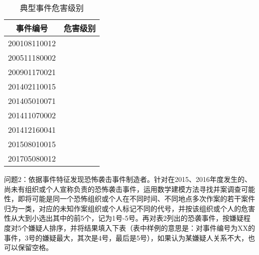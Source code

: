\documentclass[bwprint]{gmcmthesis}
\begin{document}
\renewcommand{\arraystretch}{0.8}
\begin{table}[hbp]%
	\centering
	\caption{典型事件危害级别}
	\begin{tabular}{|c|c|}
		\hline
		\multicolumn{1}{|p{4em}|}{事件编号} & \multicolumn{1}{p{4em}|}{危害级别} \\
		\hline
		200108110012 &  \\
		\hline
		200511180002 &  \\
		\hline
		200901170021 &  \\
		\hline
		201402110015 &  \\
		\hline
		201405010071 &  \\
		\hline
		201411070002 &  \\
		\hline
		201412160041 &  \\
		\hline
		201508010015 &  \\
		\hline
		201705080012 &  \\
		\hline
	\end{tabular}
	\label{tab:addlabel}
\end{table}%
\newpage
问题2：依据事件特征发现恐怖袭击事件制造者。针对在2015、2016年度发生的、尚未有组织或个人宣称负责的恐怖袭击事件，运用数学建模方法寻找并案调查可能性，即将可能是同一个恐怖组织或个人在不同时间、不同地点多次作案的若干案件归为一类，对应的未知作案组织或个人标记不同的代号，并按该组织或个人的危害性从大到小选出其中的前5个，记为1号-5号。再对表2列出的恐袭事件，按嫌疑程度对5个嫌疑人排序，并将结果填入下表（表中样例的意思是：对事件编号为XX的事件，3号的嫌疑最大，其次是4号，最后是5号），如果认为某嫌疑人关系不大，也可以保留空格。
\renewcommand{\arraystretch}{0.8}
\end{document}
